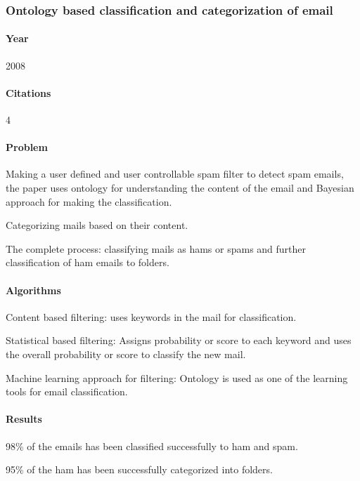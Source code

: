\documentclass[12pt]{article}
\newenvironment{my_itemize}
{\begin{itemize}
  \setlength{\itemsep}{0cm}
  \setlength{\parskip}{0cm}}
{\end{itemize}}
\begin{document}
\subsubsection{Ontology based classification and categorization of email \cite{BALAKUMAR08}}

\paragraph{Year} 2008
\paragraph{Citations} 4

\paragraph{Problem}
\begin{my_itemize}
  \item Making a user defined and user controllable spam filter to detect spam emails, 
	the paper uses ontology for understanding the content of the email and Bayesian
	approach for making the classification.
  \item Categorizing mails based on their content.
  \item The complete process: classifying mails as hams or spams and further classification of ham emails to folders.
\end{my_itemize}

\paragraph{Algorithms}
\begin{my_itemize}
  \item Content based filtering: uses keywords in the mail for classification.
  \item Statistical based filtering: Assigns probability or score to each keyword 
	and uses the overall probability or score to classify the new mail.
  \item Machine learning approach for filtering: Ontology is used as one of the 
	learning tools for email classification.
\end{my_itemize}

\paragraph{Results}
\begin{my_itemize}
  \item 98\% of the emails has been classified successfully to ham and spam.
  \item 95\% of the ham has been successfully categorized into folders.
\end{my_itemize}
\end{document}
